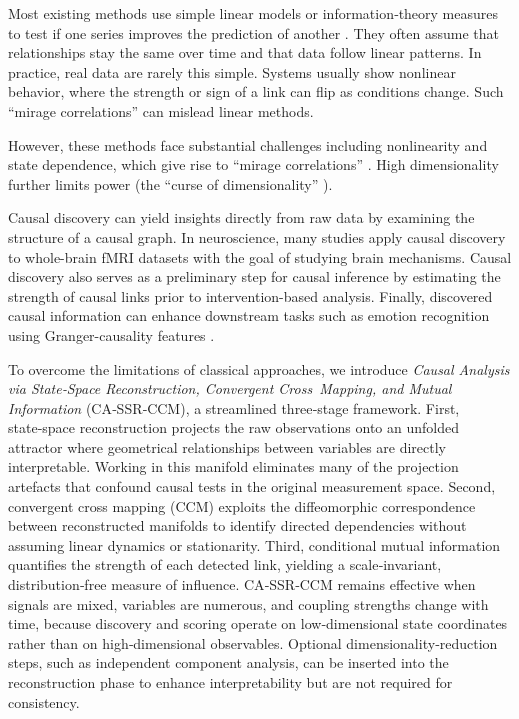 \documentclass[14pt]{extarticle}
\begin{document}
	Most existing methods use simple linear models or information‐theory measures to test if one series improves the prediction of another \citep{Granger1969,Schreiber2000}.  
	They often assume that relationships stay the same over time and that data follow linear patterns.  
	In practice, real data are rarely this simple.  
	Systems usually show nonlinear behavior, where the strength or sign of a link can flip as conditions change.  
	Such “mirage correlations” can mislead linear methods.
	   
	However, these methods face substantial challenges including nonlinearity and state dependence, which give rise to “mirage correlations” \citep{Sugihara2012}.  
	High dimensionality further limits power (the “curse of dimensionality” \citep{Runge2019}).  
	
	Causal discovery can yield insights directly from raw data by examining the structure of a causal graph.  
	In neuroscience, many studies apply causal discovery to whole-brain fMRI datasets with the goal of studying brain mechanisms.  
	Causal discovery also serves as a preliminary step for causal inference by estimating the strength of causal links prior to intervention-based analysis.  
	Finally, discovered causal information can enhance downstream tasks such as emotion recognition using Granger-causality features \citep{ExampleEmotion2019}.  
	
	To overcome the limitations of classical approaches, we introduce \emph{Causal Analysis via State‑Space Reconstruction, Convergent Cross Mapping, and Mutual Information} (CA‑SSR‑CCM), a streamlined three‑stage framework.  
	First, state‑space reconstruction projects the raw observations onto an unfolded attractor where geometrical relationships between variables are directly interpretable.  
	Working in this manifold eliminates many of the projection artefacts that confound causal tests in the original measurement space.  
	Second, convergent cross mapping (CCM) exploits the diffeomorphic correspondence between reconstructed manifolds to identify directed dependencies without assuming linear dynamics or stationarity.  
	Third, conditional mutual information quantifies the strength of each detected link, yielding a scale‑invariant, distribution‑free measure of influence.  
	CA‑SSR‑CCM remains effective when signals are mixed, variables are numerous, and coupling strengths change with time, because discovery and scoring operate on low‑dimensional state coordinates rather than on high‑dimensional observables.  
	Optional dimensionality‑reduction steps, such as independent component analysis, can be inserted into the reconstruction phase to enhance interpretability but are not required for consistency.  
	
\end{document}
